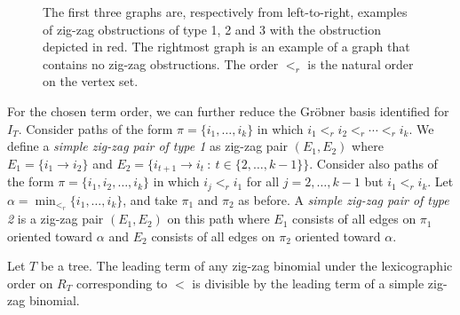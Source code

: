 \begin{example}
\begin{figure}
        \caption{The first three graphs are, respectively from left-to-right, examples of zig-zag obstructions of type 1, 2 and 3 with the obstruction depicted in red. The rightmost graph is an example of a graph that contains no zig-zag obstructions. The order $<_r$ is the natural order on the vertex set.}
        \label{fig: zig-zag obstructions}
\end{figure}
\end{example}

For the chosen term order, we can further reduce the Gr\"obner basis identified for $I_T$.  
Consider paths of the form $\pi = \{i_1,\ldots, i_k\}$ in which $i_1 <_r i_2 <_r \cdots <_r i_k$.  
We define a \emph{simple zig-zag pair of type 1} as zig-zag pair $(E_1,E_2)$ where
$E_1 = \{i_1 \rightarrow i_{2}\}$ and $E_2 = \{i_{t+1} \rightarrow i_{t}~ :~ t\in\{2,\ldots, k-1\}\}$.
Consider also paths of the form $\pi = \{i_1,i_2,\ldots, i_k\}$ in which $i_j <_r i_1$ for all $j = 2,\ldots, k-1$ but $i_1 <_r i_k$.  
Let $\alpha = \min_{<_r}\{i_1,\ldots, i_k\}$, and take $\pi_1$ and $\pi_2$ as before.  
A \emph{simple zig-zag pair of type 2} is a zig-zag pair $(E_1,E_2)$ on this path where $E_1$ consists of all edges on $\pi_1$ oriented toward $\alpha$ and $E_2$ consists of all edges on $\pi_2$ oriented toward $\alpha$. 

\begin{lemm}
    \label{lem: simple zig-zags}
    Let $T$ be a tree.  The leading term of any zig-zag binomial under the lexicographic order on $R_T$ corresponding to $<$ is divisible by the leading term of a simple zig-zag binomial.
\end{lemm}

